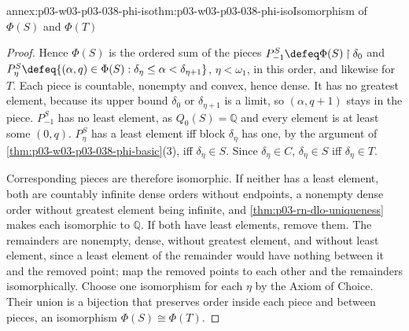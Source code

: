 \begin{annexitem}{annex:p03-w03-p03-038-phi-iso}{thm:p03-w03-p03-038-phi-iso}{Isomorphism of \(\Phi(S)\) and \(\Phi(T)\)}
\begin{proof}
Hence \(\Phi(S)\) is the ordered sum of the pieces
\(P^S_{-1}\defeq\Phi(S)\mathbin{\upharpoonright}\delta_0\) and
\(P^S_\eta\defeq\{(\alpha,q)\in\Phi(S):\delta_\eta\le\alpha<\delta_{\eta+1}\}\),
\(\eta<\omega_1\), in this order, and likewise for \(T\). Each piece is
countable, nonempty and convex, hence dense. It has no greatest element,
because its upper bound \(\delta_0\) or \(\delta_{\eta+1}\) is a limit, so
\((\alpha,q+1)\) stays in the piece. \(P^S_{-1}\) has no least element, as
\(Q_0(S)=\mathbb Q\) and every element is at least some \((0,q)\). \(P^S_\eta\)
has a least element iff block \(\delta_\eta\) has one, by the argument of
\cref{thm:p03-w03-p03-038-phi-basic}(3), iff \(\delta_\eta\in S\). Since
\(\delta_\eta\in C\), \(\delta_\eta\in S\) iff \(\delta_\eta\in T\).

Corresponding pieces are therefore isomorphic. If neither has a least
element, both are countably infinite dense orders without endpoints, a
nonempty dense order without greatest element being infinite, and
\cref{thm:p03-rn-dlo-uniqueness} makes each isomorphic to \(\mathbb Q\). If
both have least elements, remove them. The remainders are nonempty, dense,
without greatest element, and without least element, since a least element
of the remainder would have nothing between it and the removed point; map
the removed points to each other and the remainders isomorphically. Choose
one isomorphism for each \(\eta\) by the Axiom of Choice. Their union is a
bijection that preserves order inside each piece and between pieces, an
isomorphism \(\Phi(S)\cong\Phi(T)\).
\end{proof}
\end{annexitem}

